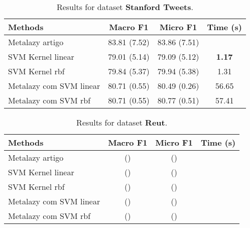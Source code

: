 \documentclass{article}
\begin{document}
	\begin{table}[ht]
		\small
		\centering	
		\begin{tabular}{l c c c}	
			\toprule
			\textbf{Methods} & \textbf{Macro F1} & \textbf{Micro F1} & \textbf{Time (s)} \\
			\midrule    
			Metalazy artigo & 83.81 (7.52) & 83.86 (7.51) & \\
			SVM Kernel linear & 79.01 (5.14) & 79.09 (5.12) & \textbf{1.17}\\
			SVM Kernel rbf &  79.84 (5.37) & 79.94 (5.38) & 1.31\\
			Metalazy com SVM linear & 80.71 (0.55)  & 80.49 (0.26) & 56.65 \\	
			Metalazy com SVM rbf & 80.71 (0.55) & 80.77 (0.51) & 57.41\\	
			\bottomrule 
		\end{tabular}
		\caption{Results for dataset \textbf{Stanford Tweets}.}
		\label{tab:dataset_Stanford}
	\end{table}

		
	\begin{table}[t]
		\small
		\centering	
		\begin{tabular}{l c c c}	
			\toprule
			\textbf{Methods} & \textbf{Macro F1} & \textbf{Micro F1} & \textbf{Time (s)} \\
			\midrule    
			Metalazy artigo &  () &  () & \\
			SVM Kernel linear &  () &  () & \\
			SVM Kernel rbf &   () &  () & \\
			Metalazy com SVM linear &  ()  &  () &  \\	
			Metalazy com SVM rbf &  () & () & \\	
			\bottomrule 
		\end{tabular}
		\caption{Results for dataset \textbf{Reut}.}
		\label{tab:dataset_reut}
	\end{table}
	




\begin{comment}
\begin{table}[t]
	\small
	\centering	
	\begin{tabular}{c c c}	
		\toprule
		\textbf{Methods} & & \textbf{STANFORD\_TWEETS}\\
		\midrule    
		\multirow{2}{*}{METALAZY}& macro F1  \\ &micro F1 \\	
		\bottomrule 
	\end{tabular}
	\caption{The cardinality of $P$ and $F$ for different cities.}
	\label{tab:dataset}
\end{table}
\end{comment}
\end{document}
